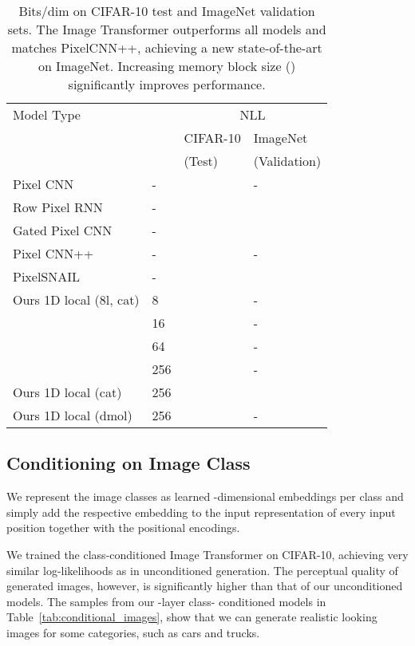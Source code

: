 \documentclass{article}
\begin{document}
\begin{table}\centering
\caption{Bits/dim on CIFAR-10 test and ImageNet validation sets. The Image Transformer outperforms all models and matches PixelCNN++, achieving a new state-of-the-art on ImageNet. Increasing memory block size () significantly improves performance.}
\vspace{2mm}


\begin{tabular}{llll}
Model Type &  & \multicolumn{2}{c}{NLL}  \\
 & & CIFAR-10 & ImageNet \\
 & & (Test) & (Validation) \\
\hline
Pixel CNN & - &  & -\\
Row Pixel RNN & - &   &  \\
Gated Pixel CNN & - &  & \\
Pixel CNN++ & - &  & -\\
PixelSNAIL & - &  & \\
\hline
Ours 1D local (8l, cat) & 8 &  & - \\
 & 16 &  & - \\
 & 64 &  & - \\
 & 256 &  & - \\ \hline
Ours 1D local (cat) & 256 &  &  \\
Ours 1D local (dmol) & 256 &  & -
\label{tab:generative-log-probs}

\end{tabular}
\end{table}

\subsection{Conditioning on Image Class}
We represent the image classes as learned -dimensional embeddings per class and simply add the respective embedding to the input representation of every input position together with the positional encodings.

We trained the class-conditioned Image Transformer on CIFAR-10, achieving very similar log-likelihoods as in unconditioned generation. The perceptual quality of generated images, however, is significantly higher than that of our unconditioned models. The samples from our -layer class- conditioned models in Table~\ref{tab:conditional_images}, show that we can generate realistic looking images for some categories, such as cars and trucks.
\end{document}
